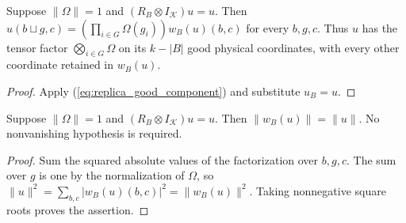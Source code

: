 \begin{theorem}
\label{thm:replica_good_fixed}
\leanok
{}
Suppose $\|\Omega\|=1$ and $(R_B\otimes I_{\mathcal K})u=u$.
Then $u(b\sqcup g,c)=(\prod_{i\in G}\Omega(g_i))w_B(u)(b,c)$ for every $b,g,c$.
Thus $u$ has the tensor factor $\bigotimes_{i\in G}\Omega$ on its
$k-|B|$ good physical coordinates, with every other coordinate retained
in $w_B(u)$.
\end{theorem}
\begin{proof}
\leanok
{}
Apply (\ref{eq:replica_good_component}) and substitute $u_B=u$.
\end{proof}

\begin{theorem}
\label{thm:replica_good_norm}
\leanok
{}
Suppose $\|\Omega\|=1$ and $(R_B\otimes I_{\mathcal K})u=u$.
Then $\|w_B(u)\|=\|u\|$. No nonvanishing hypothesis is required.
\end{theorem}
\begin{proof}
\leanok
{}
Sum the squared absolute values of the factorization over $b,g,c$.
The sum over $g$ is one by the normalization of $\Omega$, so
$\|u\|^2=\sum_{b,c}|w_B(u)(b,c)|^2=\|w_B(u)\|^2$.
Taking nonnegative square roots proves the assertion.
\end{proof}
